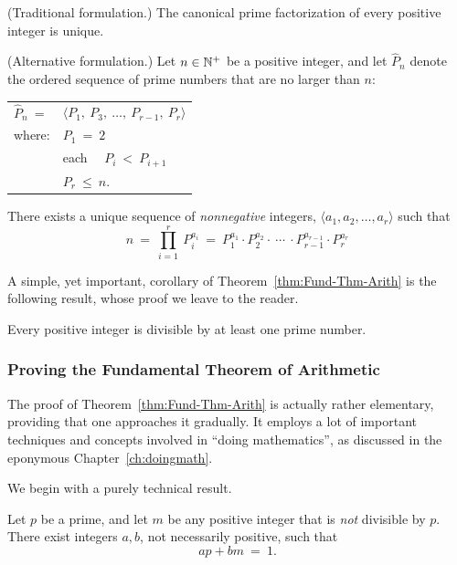 \begin{theorem}
\label{thm:Fund-Thm-Arith}

\noindent
{\rm (Traditional formulation.)}
%
The canonical prime factorization of every positive integer is unique.

\noindent
{\rm (Alternative formulation.)}
%
Let $n \in \mathbb{N}^+$ be a positive integer, and let $\widehat{P}_n$ denote the
ordered sequence of prime numbers that are no larger than $n$:

\begin{tabular}{ll}
$\widehat{P}_n \ =$  & $\langle P_1, \ P_3, \ \ldots, \ P_{r-1}, \ P_r \rangle$ \\
where:               & $P_1 \ = \ 2$ \\
                     & each  \ \ $P_i \ < \ P_{i+1}$ \\
                     & $P_r \ \leq \ n$.
\end{tabular}

\noindent
There exists a unique sequence of {\em nonnegative} integers, 
$\langle a_1, a_2, \ldots, a_r \rangle$
such that
\[
n \ = \ \prod_{i=1}^r \ P_i^{a_i} \ = \
P_1^{a_1} \cdot P_2^{a_2} \cdot \ \cdots \ \cdot P_{r-1}^{a_{r-1}} \cdot P_r^{a_r}
\]
\end{theorem}

A simple, yet important, corollary of Theorem~\ref{thm:Fund-Thm-Arith}
is the following result, whose proof we leave to the reader.

\begin{prop}
\label{thm:prime-divisor}
Every positive integer is divisible by at least one prime number.
\end{prop}


\subsubsection{Proving the Fundamental Theorem of Arithmetic}

The  proof of Theorem~\ref{thm:Fund-Thm-Arith} is actually rather
elementary, providing that one approaches it gradually.  It
employs a lot of important techniques and concepts involved in ``doing
mathematics'', as discussed in the eponymous Chapter~\ref{ch:doingmath}.

We begin with a purely technical result.

\begin{prop}
\label{thm:p-n-linear}
Let $p$ be a prime, and let $m$ be any positive integer that is {\em
  not} divisible by $p$.  There exist integers $a, b$, not necessarily
positive, such that
\[ ap + bm \ = \ 1. \]
\end{prop}

